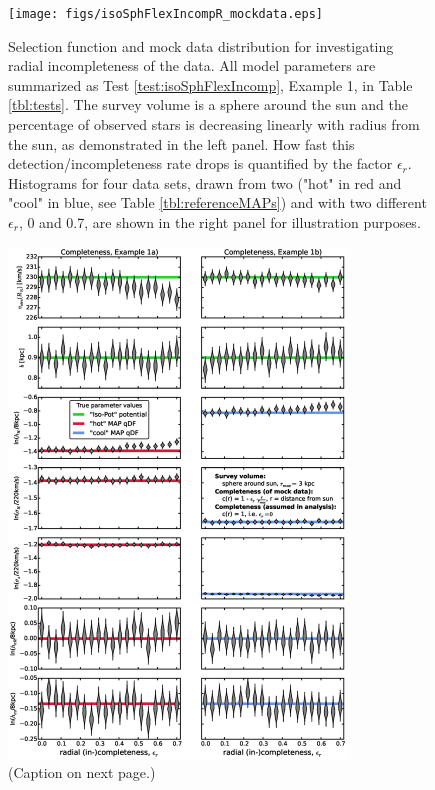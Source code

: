 
\begin{figure}
\texttt{[image: figs/isoSphFlexIncompR\_mockdata.eps]}
\caption{Selection function and mock data distribution for investigating radial incompleteness of the data. All model parameters are summarized as Test \ref{test:isoSphFlexIncomp}, Example 1, in Table \ref{tbl:tests}. The survey volume is a sphere around the sun and the percentage of observed stars is decreasing linearly with radius from the sun, as demonstrated in the left panel. How fast this detection/incompleteness rate drops is quantified by the factor $\epsilon_r$. Histograms for four data sets, drawn from two \MAPs ("hot" in red and "cool" in blue, see Table \ref{tbl:referenceMAPs}) and with two different $\epsilon_r$, 0 and 0.7, are shown in the right panel for illustration purposes.} 
\label{fig:isoSphFlexIncompR_mockdata}
\end{figure}


\begin{figure}
\centering
\includegraphics[width=0.8\textwidth]{figs/isoSphFlexIncompR_violins.eps}
\caption{(Caption on next page.)}
\end{figure}


